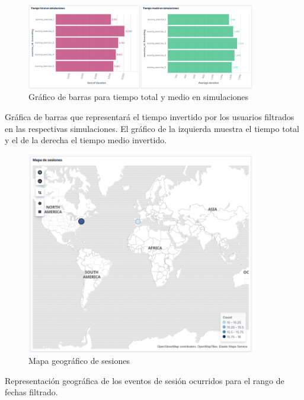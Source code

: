 \documentclass[11pt,a4paper]{book}
\begin{document}
				\begin{figure}[H]
					\centering
					\includegraphics[width=10cm, keepaspectratio]{img/kibana_05_simulations}
					\caption{Gráfico de barras para tiempo total y medio en simulaciones}
					\label{fig:kibana_simulations}
				\end{figure}
				Gráfica de barras que representará el tiempo invertido por los usuarios filtrados en las respectivas simulaciones. El gráfico de la izquierda muestra el tiempo total y el de la derecha el tiempo medio invertido.\\
				
				\begin{figure}[H]
					\centering
					\includegraphics[width=10cm, keepaspectratio]{img/kibana_06_map}
					\caption{Mapa geográfico de sesiones}
					\label{fig:kibana_map}
				\end{figure}
				Representación geográfica de los eventos de sesión ocurridos para el rango de fechas filtrado.\\
				
\end{document}

